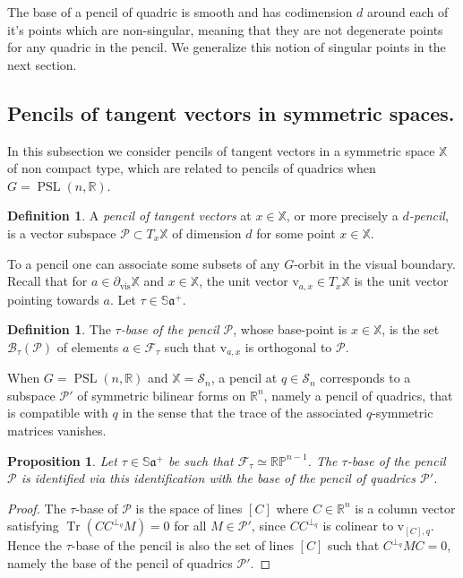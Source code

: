\documentclass[reqno,10pt]{amsart}
\theoremstyle{plain}
\newtheorem{prop}[thm]{Proposition}
\theoremstyle{definition}
\newtheorem{defn}[thm]{Definition}
\theoremstyle{remark}
\newcommand{\type}{\tau}
\newcommand{\R}{\mathbb{R}}
\newcommand{\Sph}{\mathbb{S}}
\DeclareMathOperator{\vis}{vis}
\newcommand{\partialvis}{\partial_{\vis}}
\DeclareMathOperator{\tr}{Tr}
\DeclareMathOperator{\PSL}{PSL}
\newcommand{\X}{\mathbb{X}}
\newcommand{\ie}{namely }
\begin{document}
The base of a pencil of quadric is smooth and has codimension $d$ around each of it's points which are non-singular, meaning that they are not degenerate points for any quadric in the pencil. We generalize this notion of singular points in the next section.

\subsection{Pencils of tangent vectors in symmetric spaces.}

In this subsection we consider pencils of tangent vectors in a symmetric space $\X$ of non compact type, which are related to pencils of quadrics when $G=\PSL(n,\R)$.

\begin{defn}
A \emph{pencil of tangent vectors} at $x\in \X$, or more precisely a \emph{$d$-pencil}, is a vector subspace $\mathcal{P}\subset T_x\X$ of dimension $d$ for some point $x\in \X$.
\end{defn}

 To a pencil one can associate some subsets of any $G$-orbit in the visual boundary. Recall that for $a\in \partialvis \X$ and $x\in \X$, the unit vector $\mathrm{v}_{a,x}\in T_x\X$ is the unit vector pointing towards $a$. Let $\type\in \Sph \mathfrak{a}^+$.

\begin{defn}
The \emph{$\type$-base of the pencil $\mathcal{P}$}, whose base-point is $x\in \X$, is the set $\mathcal{B}_\type(\mathcal{P})$ of elements $a\in \mathcal{F}_\type$ such that $\mathrm{v}_{a,x}$ is orthogonal to $\mathcal{P}$.
\end{defn}

When $G=\PSL(n,\R)$ and $\X=\mathcal{S}_n$, a pencil at $q\in \mathcal{S}_n$ corresponds to a subspace $\mathcal{P}'$ of symmetric bilinear forms on $\R^n$, \ie a pencil of quadrics, that is compatible with $q$ in the sense that the trace of the associated $q$-symmetric matrices vanishes. 


\begin{prop}
\label{prop:PencilQuadrics}
Let $\type\in \Sph \mathfrak{a}^+$ be such that $\mathcal{F}_\type\simeq \mathbb{RP}^{n-1}$. The $\type$-base of the pencil $\mathcal{P}$ is identified via this identification with the base of the pencil of quadrics $\mathcal{P}'$. 
\end{prop}

\begin{proof}
The $\type$-base of $\mathcal{P}$ is the space of lines $[C]$ where $C\in \R^n$ is a column vector satisfying $\tr(CC^{\perp_q}M)=0$ for all $M\in \mathcal{P}'$, since $CC^{\perp_q}$ is colinear to $\mathrm{v}_{[C],q}$. Hence the $\type$-base of the pencil is also the set of lines $[C]$ such that $C^{\perp_q}MC=0$, \ie the base of the pencil of quadrics $\mathcal{P}'$.

\end{proof}
\end{document}
